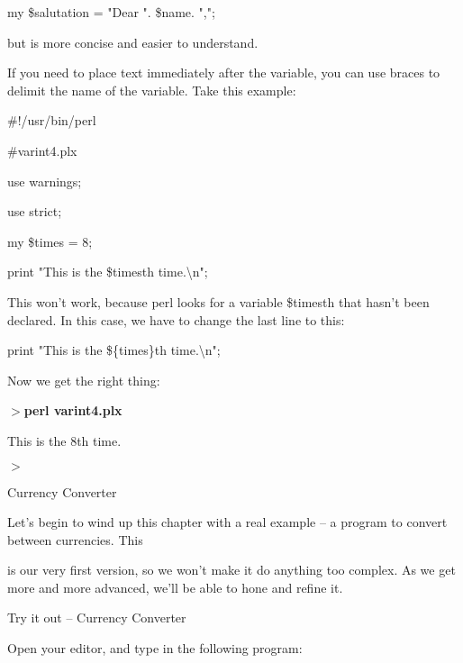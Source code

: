 \documentclass[a4paper,11pt]{book}
\begin{document}
\noindent 

\noindent my \$salutation = "Dear ". \$name. ",";

\noindent 

\noindent but is more concise and easier to understand.

\noindent 

\noindent If you need to place text immediately after the variable, you can use braces to delimit the name of the variable. Take this example:

\noindent 

\noindent \#!/usr/bin/perl

\noindent \#varint4.plx

\noindent use warnings;

\noindent use strict;

\noindent my \$times = 8;

\noindent print "This is the \$timesth time.\textbackslash n";

\noindent 

\noindent This won't work, because perl looks for a variable \$timesth that hasn't been declared. In this case, we have to change the last line to this:

\noindent 

\noindent print "This is the \$\{times\}th time.\textbackslash n";

\noindent 

\noindent Now we get the right thing:

\noindent 

\noindent $>$\textbf{perl varint4.plx}

\noindent This is the 8th time.

\noindent $>$

\noindent 

\noindent Currency Converter

\noindent 

\noindent Let's begin to wind up this chapter with a real example -- a program to convert between currencies. This

\noindent is our very first version, so we won't make it do anything too complex. As we get more and more advanced, we'll be able to hone and refine it.

\noindent 

\noindent Try it out -- Currency Converter

\noindent 

\noindent Open your editor, and type in the following program:
\end{document}
